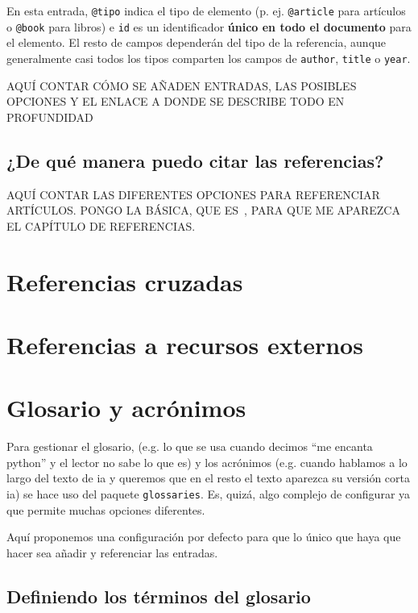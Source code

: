 En esta entrada, \texttt{@tipo} indica el tipo de elemento (p. ej. \texttt{@article} para artículos o \texttt{@book} para libros) e \texttt{id} es un identificador \textbf{único en todo el documento} para el elemento. El resto de campos dependerán del tipo de la referencia, aunque generalmente casi todos los tipos comparten los campos de \texttt{author}, \texttt{title} o \texttt{year}.

AQUÍ CONTAR CÓMO SE AÑADEN ENTRADAS, LAS POSIBLES OPCIONES Y EL ENLACE A DONDE SE DESCRIBE TODO EN PROFUNDIDAD

\subsection{¿De qué manera puedo citar las referencias?}

AQUÍ CONTAR LAS DIFERENTES OPCIONES PARA REFERENCIAR ARTÍCULOS. PONGO LA BÁSICA, QUE ES~\cite{mcculloch1943logical}, PARA QUE ME APAREZCA EL CAPÍTULO DE REFERENCIAS.

\section{Referencias cruzadas}

\section{Referencias a recursos externos}

\section{Glosario y acrónimos}
\label{s:glosario}

Para gestionar el glosario, (e.g. lo que se usa cuando decimos \enquote{me encanta \gls{python}} y el lector no sabe lo que es) y los acrónimos (e.g. cuando hablamos a lo largo del texto de \gls{ia} y queremos que en el resto el texto aparezca su versión corta \gls{ia}) se hace uso del paquete \texttt{glossaries}. Es, quizá, algo complejo de configurar ya que permite muchas opciones diferentes.

Aquí proponemos una configuración por defecto para que lo único que haya que hacer sea añadir y referenciar las entradas.

\subsection{Definiendo los términos del glosario}

